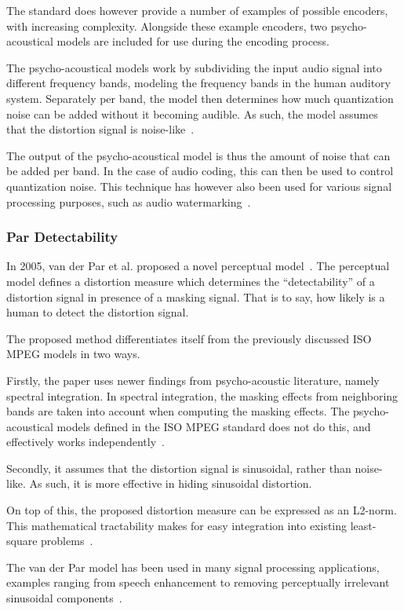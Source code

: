 The standard does however provide a number of examples of possible encoders, with increasing complexity.
Alongside these example encoders, two psycho-acoustical models are included for use during the encoding process. 

The psycho-acoustical models work by subdividing the input audio signal into different frequency bands, 
modeling the frequency bands in the human auditory system.
Separately per band, the model then determines how much quantization noise can be added without it becoming audible.
As such, the model assumes that the distortion signal is noise-like~\cite{van2005perceptual}.

The output of the psycho-acoustical model is thus the amount of noise that can be added per band.
In the case of audio coding, this can then be used to control quantization noise.
This technique has however also been used for various signal processing purposes, such as audio watermarking~\cite{taal2012low}.

\subsubsection{Par Detectability}
In 2005, van der Par et al. proposed a novel perceptual model~\cite{van2005perceptual}.
The perceptual model defines a distortion measure which determines the ``detectability'' of a distortion signal 
in presence of a masking signal.
That is to say, how likely is a human to detect the distortion signal.

The proposed method differentiates itself from the previously discussed ISO MPEG models in two ways.

Firstly, the paper uses newer findings from psycho-acoustic literature, namely spectral integration.
In spectral integration, the masking effects from neighboring bands are taken into account when computing the masking effects.
The psycho-acoustical models defined in the ISO MPEG standard does not do this, and effectively works independently~\cite{taal2012low}.

Secondly, it assumes that the distortion signal is sinusoidal, rather than noise-like.
As such, it is more effective in hiding sinusoidal distortion.

On top of this, the proposed distortion measure can be expressed as an L2-norm.
This mathematical tractability makes for easy integration into existing least-square problems~\cite{taal2012low}.

The van der Par model has been used in many signal processing applications, examples ranging from speech enhancement to removing perceptually irrelevant sinusoidal 
components~\cite{balazs2009time, taal2013optimal}.

